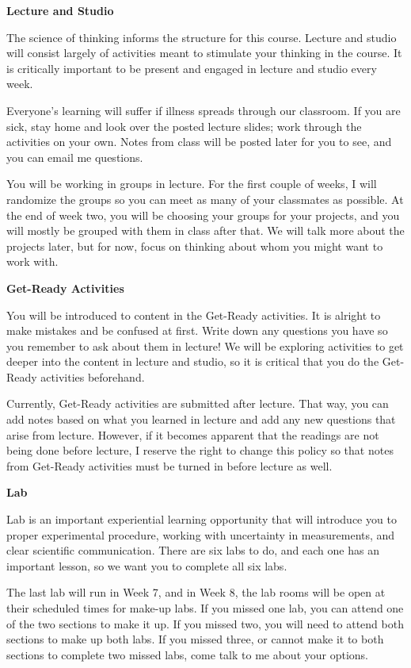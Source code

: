 \documentclass[]{article}
\begin{document}
\newpage
\begin{TeacherMargin}
\noindent\textbf{Lecture and Studio}

The science of thinking informs the structure for this course. Lecture and studio will consist largely of activities meant to stimulate your thinking in the course. It is critically important to be present and engaged in lecture and studio every week.

Everyone's learning will suffer if illness spreads through our classroom. If you are sick, stay home and look over the posted lecture slides; work through the activities on your own. Notes from class will be posted later for you to see, and you can email me questions.

You will be working in groups in lecture. For the first couple of weeks, I will randomize the groups so you can meet as many of your classmates as possible. At the end of week two, you will be choosing your groups for your projects, and you will mostly be grouped with them in class after that. We will talk more about the projects later, but for now, focus on thinking about whom you might want to work with.

\noindent\textbf{Get-Ready Activities}

You will be introduced to content in the Get-Ready activities. It is alright to make mistakes and be confused at first. Write down any questions you have so you remember to ask about them in lecture! We will be exploring activities to get deeper into the content in lecture and studio, so it is critical that you do the Get-Ready activities beforehand.

Currently, Get-Ready activities are submitted after lecture. That way, you can add notes based on what you learned in lecture and add any new questions that arise from lecture. However, if it becomes apparent that the readings are not being done before lecture, I reserve the right to change this policy so that notes from Get-Ready activities must be turned in before lecture as well.

\noindent\textbf{Lab}

Lab is an important experiential learning opportunity that will introduce you to proper experimental procedure, working with uncertainty in measurements, and clear scientific communication. There are six labs to do, and each one has an important lesson, so we want you to complete all six labs.

The last lab will run in Week 7, and in Week 8, the lab rooms will be open at their scheduled times for make-up labs. If you missed one lab, you can attend one of the two sections to make it up. If you missed two, you will need to attend both sections to make up both labs. If you missed three, or cannot make it to both sections to complete two missed labs, come talk to me about your options.


\end{TeacherMargin}
\end{document}
